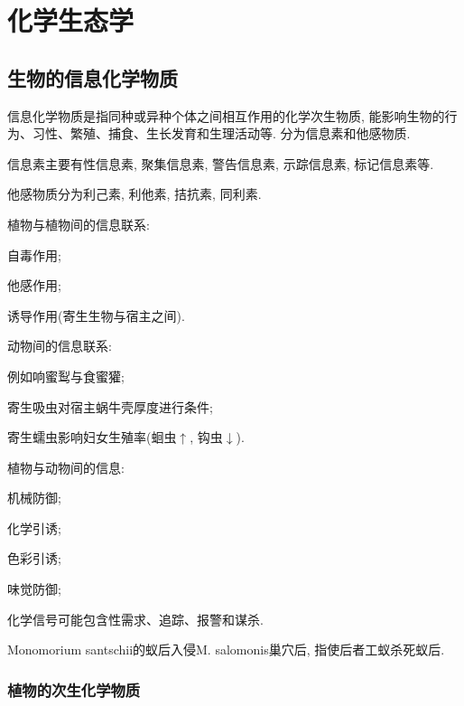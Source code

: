 \documentclass{ctexart}
\begin{document}
\section{化学生态学} %
\label{sec:化学生态学}

\subsection{生物的信息化学物质} %
\label{sub:生物的信息化学物质}

信息化学物质是指同种或异种个体之间相互作用的化学次生物质, 能影响生物的行为、习性、繁殖、捕食、生长发育和生理活动等. 分为信息素和他感物质.
\par
信息素主要有性信息素, 聚集信息素, 警告信息素, 示踪信息素, 标记信息素等.
\par
他感物质分为利己素, 利他素, 拮抗素, 同利素.
\begin{cenum}
    \item 植物与植物间的信息联系:
    \begin{cenum}
        \item 自毒作用;
        \item 他感作用;
        \item 诱导作用(寄生生物与宿主之间).
    \end{cenum}
    \item 动物间的信息联系:
    \begin{cenum}
        \item 例如响蜜䴕与食蜜獾;
        \item 寄生吸虫对宿主蜗牛壳厚度进行条件;
        \item 寄生蠕虫影响妇女生殖率(蛔虫$\uparrow$, 钩虫$\downarrow$).
    \end{cenum}
    \item 植物与动物间的信息:
    \begin{cenum}
        \item 机械防御;
        \item 化学引诱;
        \item 色彩引诱;
        \item 味觉防御;
    \end{cenum}
\end{cenum}
化学信号可能包含性需求、追踪、报警和谋杀.
\begin{ex}
    Monomorium santschii的蚁后入侵M. salomonis巢穴后, 指使后者工蚁杀死蚁后.
\end{ex}

\subsubsection{植物的次生化学物质} %
\label{ssub:植物的次生化学物质}
\end{document}
